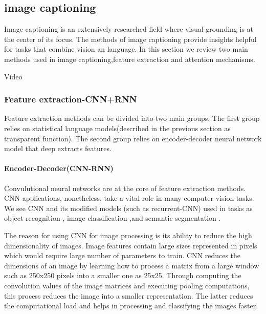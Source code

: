 






\subsection{image captioning}

Image captioning is an extensively researched field where visual-grounding is at the  center of its focus. The methods of image captioning provide insights helpful for tasks that combine vision an language. In this section we review two main methods used in image captioning,feature extraction and attention mechanisms.   

Video \cite{Lin2014VisualSS}


\subsubsection{Feature extraction-CNN+RNN}

Feature extraction methods can be divided into two main groups. The first group relies on statistical language models(described in the previous section as transparent function). The second group relies on encoder-decoder neural network model that deep extracts features.\cite{Imagecap}

\paragraph{Encoder-Decoder(CNN-RNN)}



Convulutional neural networks are at the core of feature extraction methods. CNN applications, nonetheless, take a vital role in many computer vision tasks. We see CNN and its modified models (such as recurrent-CNN) used in tasks as object recognition \cite{liang2015recurrent} \cite{objdet} \cite{Ren2015FasterRT} , image classification \cite{simonyan2014very} \cite{imclassfication},and  semantic segmentation \cite{hariharan2015hypercolumns} \cite{imseg}. 

The reason for using CNN for image processing  is its ability to reduce the high dimensionality of images. Image features contain large sizes represented in pixels which would require large number of parameters to train. CNN reduces the dimensions of an image by learning how to process a matrix from a large window such as 250x250 pixels into a smaller one as 25x25. Through computing the convolution values of the image matrices and executing pooling computations, this process reduces the image into a smaller representation. The latter reduces the computational load and helps in processing and classifying the images faster.   


